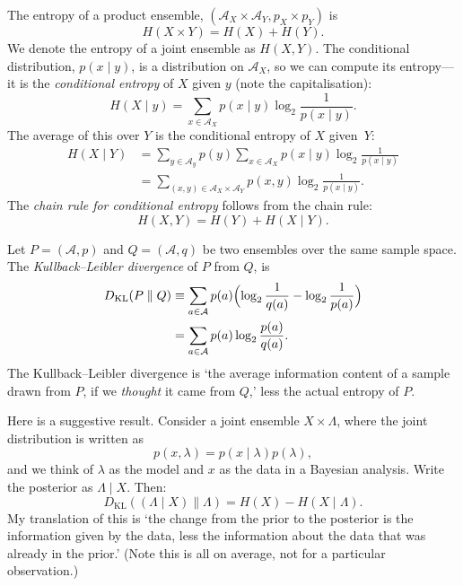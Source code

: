 \documentclass[10pt, a4paper, twocolumn]{article}
\begin{document}
The entropy of a product ensemble, $(\mathcal{A}_X\times\mathcal{A}_Y, p_X\times p_Y)$ is
\[
H(X\times Y) = H(X) + H(Y).
\]
We denote the entropy of a joint ensemble as $H(X, Y)$. The conditional
distribution, $p(x\mid y)$, is a distribution on $\mathcal{A}_X$, so we can compute
its entropy---it is the \emph{conditional entropy} of $X$ given $y$ (note the
capitalisation):
\[
H(X \mid y) = \sum_{x\in \mathcal{A}_X} p(x\mid y)\log_2 \frac{1}{p(x\mid y)}.
\]
The average of this over $Y$ is the conditional entropy of $X$ given~$Y$:
\[
\begin{aligned}
  H(X \mid Y) &= \sum_{y\in \mathcal{A}_y} p(y) \sum_{x\in \mathcal{A}_X} p(x\mid y)\log_2 \frac{1}{p(x\mid
    y)} \\
  &= \sum_{(x,y)\in\mathcal{A}_X\times\mathcal{A}_Y} p(x, y) \log_2\frac{1}{p(x\mid y)}.
\end{aligned}
\]
The \emph{chain rule for conditional entropy} follows from the chain rule:
\[
H(X, Y) = H(Y) + H(X \mid Y).
\]

Let $P=(\mathcal{A}, p)$ and $Q=(\mathcal{A}, q)$ be two ensembles over the same
sample space. The \emph{Kullback--Leibler divergence} of $P$ from $Q$, is
\[
\begin{aligned}
D_{\text{KL}}(P \parallel Q) &\equiv \sum_{a\in\mathcal{A}} p(a) \Bigl( \log_2\frac{1}{q(a)} -
\log_2\frac{1}{p(a)} \Bigr) \\
&= \sum_{a\in\mathcal{A}} p(a)\log_2\frac{p(a)}{q(a)}.
\end{aligned}
\]
The Kullback--Leibler divergence is `the average information content of a
sample drawn from $P$, if we \emph{thought} it came from $Q$,' less the actual
entropy of $P$.

Here is a suggestive result. Consider a joint ensemble $X\times\Lambda$, where the joint
distribution is written as
\[
p(x, \lambda) = p(x \mid \lambda) p(\lambda),
\]
and we think of $\lambda$ as the model and $x$ as the data in a Bayesian
analysis. Write the posterior as $\Lambda \mid X$. Then:
\[
D_{\text{KL}}((\Lambda \mid X) \parallel \Lambda) = H(X) - H(X \mid \Lambda).
\]
My translation of this is `the change from the prior to the posterior is the
information given by the data, less the information about the data that was
already in the prior.' (Note this is all on average, not for a particular
observation.)

\printbibliography
\end{document}
